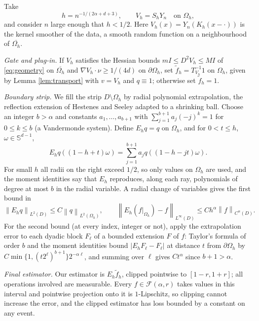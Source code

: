 \documentclass[12pt]{article}
\numberwithin{equation}{section}
\newcommand{\norm}[1]{\left\|#1\right\|}
\newcommand{\Sp}{\mathbb S^{d-1}}
\begin{document}
Take
\begin{equation}\label{eq:bandwidth}
 h=n^{-1/(2\alpha+d+3)},\qquad V_h=S_hY_n\quad\text{on }\Omega_h,
\end{equation}
and consider $n$ large enough that $h<1/2$. Here
$V_h(x)=Y_n(K_h(x-\cdot))$ is the kernel smoother of the data, a smooth
random function on a neighbourhood of $\overline{\Omega_h}$.

\emph{Gate and plug-in.} If $V_h$ satisfies the Hessian bounds
$mI\le D^2V_h\le MI$ of \eqref{eq:geometry} on $\overline{\Omega_h}$
and $\nabla V_h\cdot\nu\ge1/(4d)$ on $\partial\Omega_h$, set
$\widetilde f_h=T_{V_h}^{-1}1$ on $\Omega_h$, given by Lemma
\ref{lem:transport} with $v=V_h$ and $q\equiv1$; otherwise set
$\widetilde f_h=1$.

\emph{Boundary strip.} We fill the strip $D\setminus\Omega_h$ by radial
polynomial extrapolation, the reflection extension of Hestenes and
Seeley \cite{Hestenes,Seeley} adapted to a shrinking ball. Choose an
integer $b>\alpha$ and constants $a_1,\ldots,a_{b+1}$ with
$\sum_{j=1}^{b+1}a_j(-j)^k=1$ for $0\le k\le b$ (a Vandermonde system).
Define $E_hq=q$ on $\Omega_h$, and for $0<t\le h$, $\omega\in\Sp$,
\begin{equation}\label{eq:extension}
 E_hq((1-h+t)\omega)
       =\sum_{j=1}^{b+1}a_jq((1-h-jt)\omega).
\end{equation}
For small $h$ all radii on the right exceed $1/2$, so only values on
$\Omega_h$ are used, and the moment identities say that $E_h$
reproduces, along each ray, polynomials of degree at most $b$ in the
radial variable. A radial change of variables gives the first bound in
\begin{equation}\label{eq:extensionbounds}
 \norm{E_hq}_{L^2(D)}\le C\norm q_{L^2(\Omega_h)},\qquad
 \norm{E_h(f|_{\Omega_h})-f}_{L^\infty(D)}\le Ch^\alpha
       \norm f_{C^\alpha(D)} .
\end{equation}
For the second bound (at every index, integer or not), apply the
extrapolation error to each dyadic block $F_\ell$ of a bounded
extension $F$ of $f$: Taylor's formula of order $b$ and the moment
identities bound $|E_hF_\ell-F_\ell|$ at distance $t$ from
$\partial\Omega_h$ by $C\min\{1,(t2^\ell)^{b+1}\}2^{-\alpha\ell}$, and
summing over $\ell$ gives $Ct^\alpha$ since $b+1>\alpha$.

\emph{Final estimator.} Our estimator is $E_h\widetilde f_h$, clipped
pointwise to $[1-r,1+r]$; all operations involved are measurable.
Every $f\in\mathcal F(\alpha,r)$ takes values in this interval and
pointwise projection onto it is $1$-Lipschitz, so clipping cannot
increase the error, and the clipped estimator has loss bounded by a
constant on any event.
\end{document}
